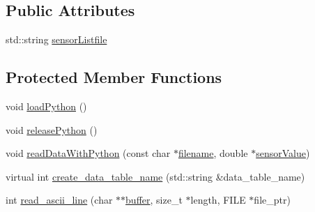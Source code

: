 \subsection*{Public Attributes}
\begin{DoxyCompactItemize}
\item 
std\-::string \hyperlink{classDAQDevice_aab515711e872a4ee38ae5b1278f64286}{sensor\-Listfile}
\end{DoxyCompactItemize}
\subsection*{Protected Member Functions}
\begin{DoxyCompactItemize}
\item 
void \hyperlink{classDAQDevice_a66f31f8b094adaa54a79fd28730248d6}{load\-Python} ()
\item 
void \hyperlink{classDAQDevice_aaebe17251aead6111efcb7bcb3006c60}{release\-Python} ()
\item 
void \hyperlink{classDAQDevice_a63bf061ad2297861e1e8d8144445235e}{read\-Data\-With\-Python} (const char $\ast$\hyperlink{classDAQDevice_a7f9cda7cf5b41f6b134c313477e9644b}{filename}, double $\ast$\hyperlink{classDAQDevice_ad148188c57598fdf4fd4c1c333aeb0d8}{sensor\-Value})
\item 
virtual int \hyperlink{classDAQDevice_add621117663b1aa2b3c3efcc115a8126}{create\-\_\-data\-\_\-table\-\_\-name} (std\-::string \&data\-\_\-table\-\_\-name)
\item 
int \hyperlink{classDAQDevice_acd12b71320ddcf9c875df0cb701cd581}{read\-\_\-ascii\-\_\-line} (char $\ast$$\ast$\hyperlink{classDAQDevice_ab661aa5c5b4bafe78354f5169b1c7d2f}{buffer}, size\-\_\-t $\ast$length, F\-I\-L\-E $\ast$file\-\_\-ptr)
\end{DoxyCompactItemize}
